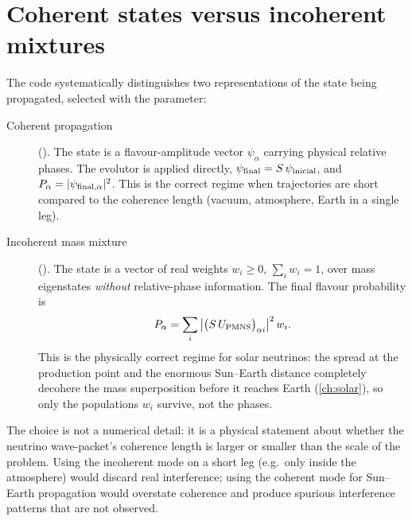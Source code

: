 \begin{implbox}
\end{implbox}

\section{Coherent states versus incoherent mixtures}
\label{sec:coherent-vs-incoherent}

\begin{theorybox}
The code systematically distinguishes two representations of the state being
propagated, selected with the  parameter:
\begin{description}
  \item[Coherent propagation] (). The state is a
    flavour-amplitude vector $\psi_\alpha$ carrying physical relative
    phases. The evolutor is applied directly,
    $\psi_{\rm final} = S\,\psi_{\rm inicial}$, and
    $P_\alpha = |\psi_{{\rm final},\alpha}|^2$. This is the correct regime
    when trajectories are short compared to the coherence length (vacuum,
    atmosphere, Earth in a single leg).
  \item[Incoherent mass mixture] (). The state is a
    vector of real weights $w_i \geq 0$, $\sum_i w_i = 1$, over mass
    eigenstates \emph{without} relative-phase information. The final flavour
    probability is
    \begin{equation}
      P_\alpha = \sum_i \left| \bigl(S\, U_{\rm PMNS}\bigr)_{\alpha i}\right|^2 w_i.
    \end{equation}
    This is the physically correct regime for solar neutrinos: the spread at
    the production point and the enormous Sun--Earth distance completely
    decohere the mass superposition before it reaches Earth
    (\cref{ch:solar}), so only the populations $w_i$ survive, not the
    phases.
\end{description}
\end{theorybox}

\begin{notebox}
The choice  is not a numerical detail: it is a
physical statement about whether the neutrino wave-packet's coherence length
is larger or smaller than the scale of the problem. Using the incoherent
mode on a short leg (e.g.\ only inside the atmosphere) would discard real
interference; using the coherent mode for Sun--Earth propagation would
overstate coherence and produce spurious interference patterns that are not
observed.
\end{notebox}

